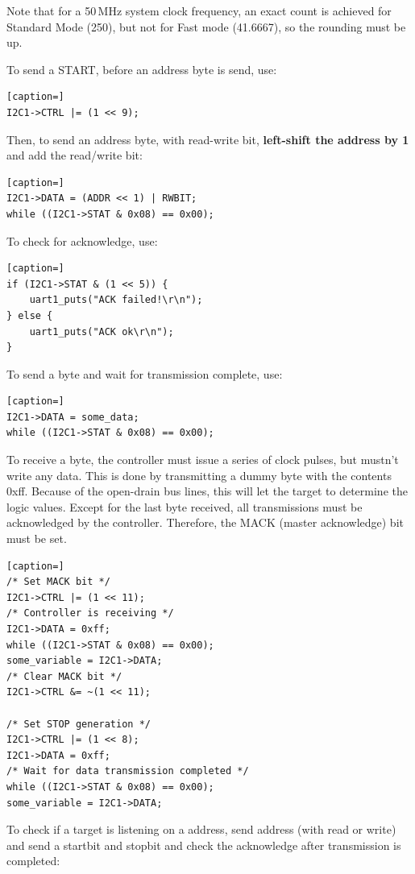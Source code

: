 \documentclass[12pt]{article}
\begin{document}
Note that for a 50\,MHz system clock frequency, an exact count is achieved for Standard Mode (250), but not for Fast mode (41.6667), so the rounding must be up.

To send a START, before an address byte is send, use:

\begin{lstlisting}[caption=]
I2C1->CTRL |= (1 << 9);
\end{lstlisting} 

Then, to send an address byte, with read-write bit, \textbf{left-shift the address by 1} and add the read/write bit:

\begin{lstlisting}[caption=]
I2C1->DATA = (ADDR << 1) | RWBIT;
while ((I2C1->STAT & 0x08) == 0x00);
\end{lstlisting} 

To check for acknowledge, use:

\begin{lstlisting}[caption=]
if (I2C1->STAT & (1 << 5)) {
    uart1_puts("ACK failed!\r\n");
} else {
    uart1_puts("ACK ok\r\n");
}
\end{lstlisting} 

To send a byte and wait for transmission complete, use:

\begin{lstlisting}[caption=]
I2C1->DATA = some_data;
while ((I2C1->STAT & 0x08) == 0x00);
\end{lstlisting} 

To receive a byte, the controller must issue a series of clock pulses, but mustn't write any data. This is done by transmitting a dummy byte with the contents 0xff. Because of the open-drain bus lines, this will let the target to determine the logic values. Except for the last byte received, all transmissions must be acknowledged by the controller. Therefore, the MACK (master acknowledge) bit must be set.

\begin{lstlisting}[caption=]
/* Set MACK bit */
I2C1->CTRL |= (1 << 11);
/* Controller is receiving */
I2C1->DATA = 0xff;
while ((I2C1->STAT & 0x08) == 0x00);
some_variable = I2C1->DATA;
/* Clear MACK bit */
I2C1->CTRL &= ~(1 << 11);

/* Set STOP generation */
I2C1->CTRL |= (1 << 8);
I2C1->DATA = 0xff;
/* Wait for data transmission completed */
while ((I2C1->STAT & 0x08) == 0x00);
some_variable = I2C1->DATA;
\end{lstlisting} 

To check if a target is listening on a address, send address (with read or write) and send a startbit and stopbit and check the acknowledge after transmission is completed:
\end{document}

